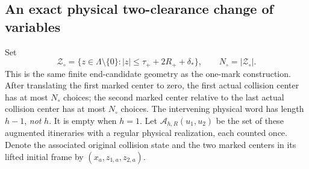 \subsection{An exact physical two-clearance change of variables}
Set
\begin{equation}\label{eq:xf-candidates}
 \mathcal Z_\circ=\{z\in\Lambda\setminus\{0\}:
           |z|\le\tau_++2R_++\delta_*\},\qquad
 N_\circ=|\mathcal Z_\circ|.
\end{equation}
This is the same finite end-candidate geometry as the one-mark
construction. After translating the first marked center to zero,
the first actual collision center has at most $N_\circ$ choices;
the second marked center relative to the last actual collision
center has at most $N_\circ$ choices. The intervening physical word
has length $h-1$, \emph{not} $h$. It is empty when $h=1$.
Let $\mathcal A_{h,R}(u_1,u_2)$ be the set of these augmented
itineraries with a regular physical realization, each counted once.
Denote the associated original collision state and the two marked
centers in its lifted initial frame by $(x_a,z_{1,a},z_{2,a})$.

